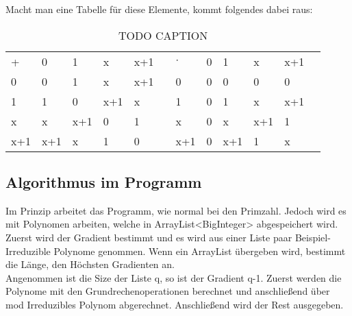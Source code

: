 Macht man eine Tabelle für diese Elemente, kommt folgendes dabei raus:

\begin{table}[h]\caption{TODO CAPTION}
    \begin{tabular}{l|l|l|l|lll|l|l|l|ll}
    +   & 0   & 1   & x   & x+1 &  & $\cdot$   & 0 & 1   & x   & x+1 &  \\ \cline{1-5} \cline{7-11}
    0   & 0   & 1   & x   & x+1 &  & 0   & 0 & 0   & 0   & 0   &  \\ \cline{1-5} \cline{7-11}
    1   & 1   & 0   & x+1 & x   &  & 1   & 0 & 1   & x   & x+1 &  \\ \cline{1-5} \cline{7-11}
    x   & x   & x+1 & 0   & 1   &  & x   & 0 & x   & x+1 & 1   &  \\ \cline{1-5} \cline{7-11}
    x+1 & x+1 & x   & 1   & 0   &  & x+1 & 0 & x+1 & 1   & x   & 
    \end{tabular}
\end{table}

\subsection*{Algorithmus im Programm}

Im Prinzip arbeitet das Programm, wie normal bei den Primzahl. Jedoch wird es mit Polynomen arbeiten, welche in ArrayList<BigInteger> abgespeichert wird.\\
Zuerst wird der Gradient bestimmt und es wird aus einer Liste paar Beispiel-Irreduzible Polynome genommen. Wenn ein ArrayList übergeben wird, bestimmt die Länge, den Höchsten Gradienten an.\\
Angenommen ist die Size der Liste q, so ist der Gradient q-1. Zuerst werden die Polynome mit den Grundrechenoperationen berechnet und anschließend über mod Irreduzibles Polynom abgerechnet. Anschließend wird der Rest ausgegeben.
\\

